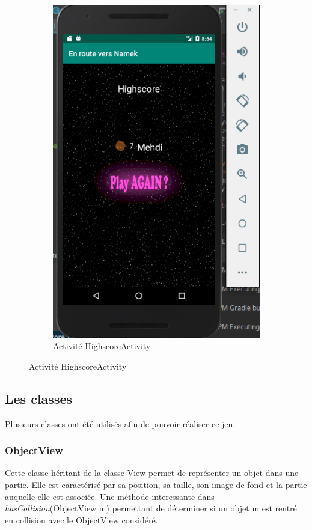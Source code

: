 \documentclass{article}
\begin{document}
\begin{figure}
\centering
 \begin{subfigure}[b]{0.4\textwidth}
  \includegraphics[width=\textwidth]{images/highscoreView.png}
  \caption{Activité HighscoreActivity}
 \end{subfigure}
\end{figure}


\subsection{Les classes}
Plusieurs classes ont été utilisés afin de pouvoir réaliser ce jeu.

\subsubsection{ObjectView}
Cette classe héritant de la classe View permet de représenter un objet dans une partie. Elle est caractérisé par sa position, sa taille, son image de fond et la partie auquelle elle est associée.
Une méthode interessante dans \textit{hasCollision}(ObjectView m) permettant de déterminer si un objet m est rentré en collision avec le ObjectView considéré.
\end{document}
